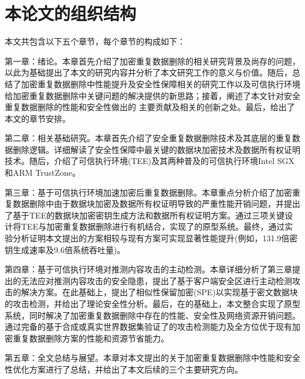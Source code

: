 \section{本论文的组织结构}
本文共包含以下五个章节，每个章节的构成如下：

第一章：绪论。本章首先介绍了加密重复数据删除的相关研究背景及尚存的问题，以此为基础提出了本文的研究内容并分析了本文研究工作的意义与价值。随后，总结了加密重复数据删除中性能提升及安全性保障相关的研究工作以及可信执行环境给加密重复数据删除中关键问题的解决提供的新思路；接着，阐述了本文针对安全重复数据删除的性能和安全性做出的 主要贡献及相关的创新之处。最后，给出了本文的章节安排。

第二章：相关基础研究。本章首先介绍了安全重复数据删除技术及其底层的重复数据删除逻辑。详细解读了安全性保障中最关键的数据块加密技术及数据所有权证明技术。随后，介绍了可信执行环境(TEE)及其两种普及的可信执行环境Intel SGX和ARM TrustZone。

第三章：基于可信执行环境加速加密后重复数据删除。本章重点分析介绍了加密重复数据删除中由于数据块加密及数据所有权证明导致的严重性能开销问题，并提出了基于TEE的数据块加密密钥生成方法和数据所有权证明方案。通过三项关键设计将TEE与加密重复数据删除进行有机结合，实现了\sysnameS 的原型系统。最终，通过实验分析证明本文提出的方案相较与现有方案可实现显著性能提升(例如，131.9倍密钥生成速率及9.6倍系统吞吐量)。

第四章：基于可信执行环境对推测内容攻击的主动检测。本章详细分析了第三章提出的\sysnameS 无法应对推测内容攻击的安全隐患，提出了基于客户端安全区进行主动检测攻击的解决方案\sysnameF。在此基础上，提出了相似性保留加密(SPE)以实现基于密文数据块的攻击检测，并给出了理论安全性分析。最后，在\sysnameS 的基础上，本文整合\sysnameF 实现了\prototype 原型系统，同时解决了加密重复数据删除中存在的性能、安全性及网络资源开销问题。通过完备的基于合成或真实世界数据集验证了\sysnameF 的攻击检测能力及\prototype 全方位优于现有加密重复数据删除方案的性能和资源节省能力。

第五章：全文总结与展望。本章对本文提出的关于加密重复数据删除中性能和安全性优化方案进行了总结，并给出了本文后续的三个主要研究方向。
